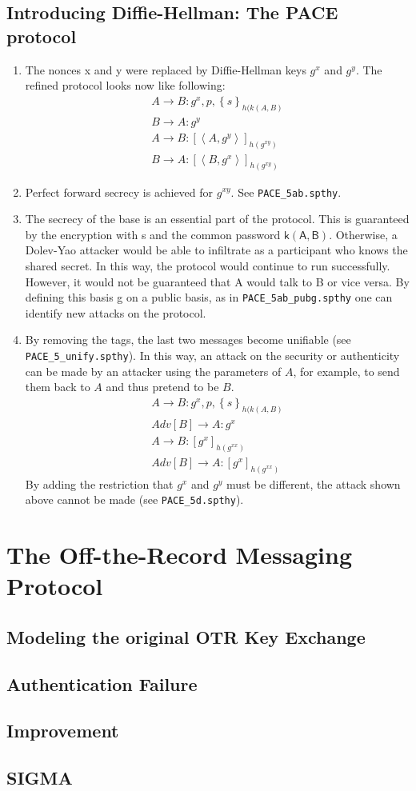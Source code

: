 \documentclass[a4paper,11pt]{scrartcl}
\newcommand{\tuple}[1]{\left\langle #1\right\rangle}
\begin{document}
\subsection{Introducing Diffie-Hellman: The PACE protocol}
\begin{enumerate}[label=\alph*)]
	\item The nonces x and y were replaced by Diffie-Hellman keys $g^x$ and $g^y$. The refined protocol looks now like following:
	  \begin{align*}
    		A \rightarrow B: g^x, p, \left\lbrace s \right\rbrace_{h(k(A,  B)}\\
		B \rightarrow A: g^y\\
		A \rightarrow B: [\tuple{A,  g^y}]_{h(g^{xy})}\\
		B \rightarrow A: [\tuple{B,  g^x}]_{h(g^{xy})}
  	\end{align*}
	\item Perfect forward secrecy is achieved for $g^{xy}$.  See \texttt{PACE_5ab.spthy}.
	\item The secrecy of the base is an essential part of the protocol. This is guaranteed by the encryption with s and the common password $\mathsf{k(A,B)}$.  Otherwise, a 				Dolev-Yao attacker would be able to infiltrate as a participant who knows the shared secret.  In this way, the protocol would continue to run successfully. However, it would 
	not be guaranteed that A would talk to B or vice versa.  By defining this basis g on a public basis, as in \texttt{PACE_5ab_pubg.spthy} one can identify new attacks on the 				protocol.
	\item By removing the tags, the last two messages become unifiable (see \texttt{PACE_5_unify.spthy}).  In this way,  an attack on the security or authenticity can be made by 		an attacker using the parameters of $A$,  for example, to send them back to $A$ and thus pretend to be $B$.  
	\begin{align*}
    		A \rightarrow B: g^x, p, \left\lbrace s \right\rbrace_{h(k(A,  B)}\\
		Adv[B] \rightarrow A: g^x\\
		A \rightarrow B: [g^x]_{h(g^{xx})}\\
		Adv[B] \rightarrow A: [g^x]_{h(g^{xx})}
  	\end{align*}	
	By adding the restriction that $g^x$ and $g^y$ must be different,  the attack shown above cannot be made (see \texttt{PACE_5d.spthy}).
\end{enumerate}
\section{The Off-the-Record Messaging Protocol}
\subsection{Modeling the original OTR Key Exchange}
\subsection{Authentication Failure}
\subsection{Improvement}
\subsection{SIGMA}
\end{document}
